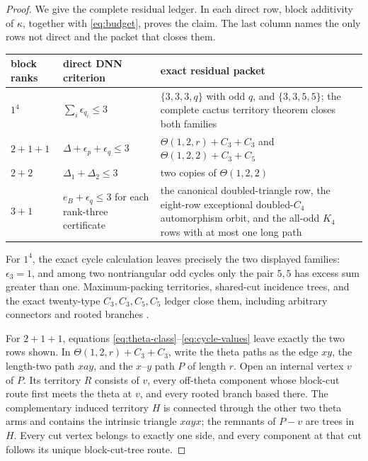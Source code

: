 \documentclass[11pt]{article}
\theoremstyle{remark}
\newcommand{\kap}{\kappa}
\begin{document}
\begin{proof}
We give the complete residual ledger.  In each direct row, block additivity of
$\kap$, together with \eqref{eq:budget}, proves the claim.  The last column
names the only rows not direct and the packet that closes them.
\begin{center}
\begin{tabular}{p{1.7cm}p{4.5cm}p{6.4cm}}
\toprule
block ranks&direct DNN criterion&exact residual packet\\
\midrule
$1^4$&$\sum_i\epsilon_{q_i}\leq3$&
$\{3,3,3,q\}$ with odd $q$, and $\{3,3,5,5\}$; the complete cactus
territory theorem closes both families\\
$2+1+1$&$\Delta+\epsilon_p+\epsilon_q\leq3$&
$\Theta(1,2,r)+C_3+C_3$ and
$\Theta(1,2,2)+C_3+C_5$\\
$2+2$&$\Delta_1+\Delta_2\leq3$&
two copies of $\Theta(1,2,2)$\\
$3+1$&$e_B+\epsilon_q\leq3$ for each rank-three certificate&
the canonical doubled-triangle row, the eight-row exceptional doubled-$C_4$
automorphism orbit, and the all-odd $K_4$ rows with at most one long path\\
\bottomrule
\end{tabular}
\end{center}

For $1^4$, the exact cycle calculation leaves precisely the two displayed
families: $\epsilon_3=1$, and among two nontriangular odd cycles only the pair
$5,5$ has excess sum greater than one.  Maximum-packing territories,
shared-cut incidence trees, and the exact twenty-type $C_3,C_3,C_5,C_5$
ledger close them, including arbitrary connectors and rooted branches
\cite{TetracyclicCactus}.

For $2+1+1$, equations \eqref{eq:theta-class}--\eqref{eq:cycle-values} leave
exactly the two rows shown.  In $\Theta(1,2,r)+C_3+C_3$, write the theta paths
as the edge $xy$, the length-two path $xay$, and the $x$--$y$ path $P$ of
length $r$.  Open an internal vertex $v$ of $P$.  Its territory $R$ consists
of $v$, every off-theta component whose block-cut route first meets the theta
at $v$, and every rooted branch based there.  The complementary induced
territory $H$ is connected through the other two theta arms and contains the
intrinsic triangle $xayx$; the remnants of $P-v$ are trees in $H$.  Every cut
vertex belongs to exactly one side, and every component at that cut follows
its unique block-cut-tree route.


\end{proof}
\end{document}
